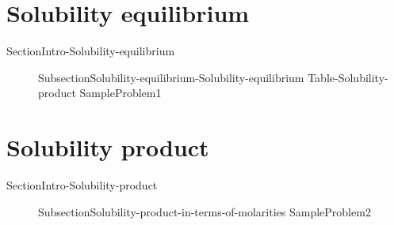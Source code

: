 \documentclass[main.tex]{subfiles}
\begin{document}
\section{Solubility equilibrium } {SectionIntro-Solubility-equilibrium}
\sloppy\begin{description}
\item[] {SubsectionSolubility-equilibrium-Solubility-equilibrium}
{Table-Solubility-product}
{SampleProblem1}
\end{description}


\section{Solubility product}   {SectionIntro-Solubility-product}
\sloppy\begin{description}
\item[]  {SubsectionSolubility-product-in-terms-of-molarities}
{SampleProblem2}
\end{description}
\end{document}
